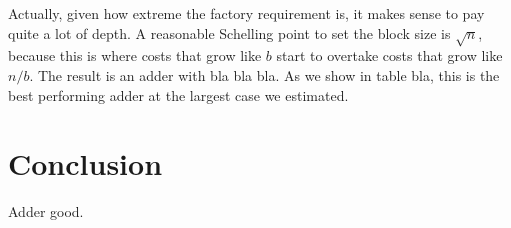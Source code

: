\documentclass[onecolumn,unpublished]{quantumarticle}
\theoremstyle{definition}
\theoremstyle{definition}
\theoremstyle{definition}
\begin{document}
Actually, given how extreme the factory requirement is, it makes sense to pay quite a lot of depth.
A reasonable Schelling point to set the block size is $\sqrt{n}$, because this is where costs that grow like $b$ start to overtake costs that grow like $n/b$.
The result is an adder with bla bla bla.
As we show in table bla, this is the best performing adder at the largest case we estimated.


\section{Conclusion}

Adder good.



\end{document}
